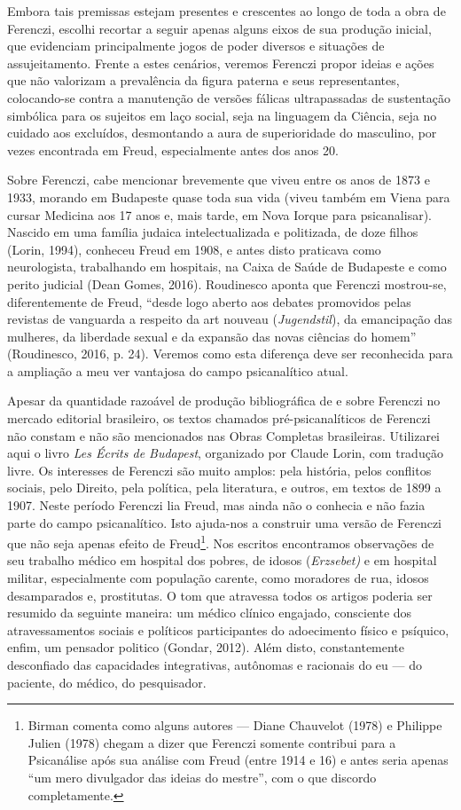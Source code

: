 Embora tais premissas estejam presentes e crescentes ao longo de toda a
obra de Ferenczi, escolhi recortar a seguir apenas alguns eixos de sua
produção inicial, que evidenciam principalmente jogos de poder diversos
e situações de assujeitamento. Frente a estes cenários, veremos Ferenczi
propor ideias e ações que não valorizam a prevalência da figura paterna
e seus representantes, colocando-se contra a manutenção de versões
fálicas ultrapassadas de sustentação simbólica para os sujeitos em laço
social, seja na linguagem da Ciência, seja no cuidado aos excluídos,
desmontando a aura de superioridade do masculino, por vezes encontrada
em Freud, especialmente antes dos anos 20.

Sobre Ferenczi, cabe mencionar brevemente que viveu entre os anos de
1873 e 1933, morando em Budapeste quase toda sua vida (viveu também em
Viena para cursar Medicina aos 17 anos e, mais tarde, em Nova Iorque
para psicanalisar). Nascido em uma família judaica intelectualizada e
politizada, de doze filhos (Lorin, 1994), conheceu Freud em 1908, e
antes disto praticava como neurologista, trabalhando em hospitais, na
Caixa de Saúde de Budapeste e como perito judicial (Dean Gomes, 2016).
Roudinesco aponta que Ferenczi mostrou-se, diferentemente de Freud,
``desde logo aberto aos debates promovidos pelas revistas de vanguarda a
respeito da art nouveau (\emph{Jugendstil}), da emancipação das
mulheres, da liberdade sexual e da expansão das novas ciências do
homem'' (Roudinesco, 2016, p. 24). Veremos como esta diferença deve ser
reconhecida para a ampliação a meu ver vantajosa do campo psicanalítico
atual.

Apesar da quantidade razoável de produção bibliográfica de e sobre
Ferenczi no mercado editorial brasileiro, os textos chamados
pré-psicanalíticos de Ferenczi não constam e não são mencionados nas
Obras Completas brasileiras. Utilizarei aqui o livro \emph{Les Écrits de
Budapest}, organizado por Claude Lorin, com tradução livre. Os
interesses de Ferenczi são muito amplos: pela história, pelos conflitos
sociais, pelo Direito, pela política, pela literatura, e outros, em
textos de 1899 a 1907. Neste período Ferenczi lia Freud, mas ainda não o
conhecia e não fazia parte do campo psicanalítico. Isto ajuda-nos a
construir uma versão de Ferenczi que não seja apenas efeito de
Freud\footnote{Birman comenta como alguns autores --- Diane Chauvelot
  (1978) e Philippe Julien (1978) chegam a dizer que Ferenczi somente
  contribui para a Psicanálise após sua análise com Freud (entre 1914 e
  16) e antes seria apenas ``um mero divulgador das ideias do mestre'',
  com o que discordo completamente.}. Nos escritos encontramos
observações de seu trabalho médico em hospital dos pobres, de idosos
(\emph{Erzsebet)} e em hospital militar, especialmente com população
carente, como moradores de rua, idosos desamparados e, prostitutas. O
tom que atravessa todos os artigos poderia ser resumido da seguinte
maneira: um médico clínico engajado, consciente dos atravessamentos
sociais e políticos participantes do adoecimento físico e psíquico,
enfim, um pensador politico (Gondar, 2012). Além disto, constantemente
desconfiado das capacidades integrativas, autônomas e racionais do eu ---
do paciente, do médico, do pesquisador.

